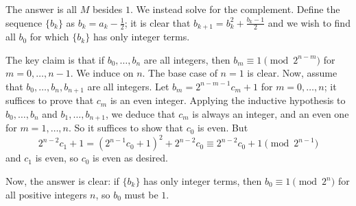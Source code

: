 The answer is all $M$ besides $1$. We instead solve for the complement. Define the sequence $\{b_k\}$ as $b_k=a_k-\frac{1}{2}$; it is clear that $b_{k+1}=b_k^2+\frac{b_k-1}{2}$ and we wish to find all $b_0$ for which $\{b_k\}$ has only integer terms.

The key claim is that if $b_0,\dots,b_n$ are all integers, then $b_m\equiv1\pmod{2^{n-m}}$ for $m=0,\dots,n-1$. We induce on $n$. The base case of $n=1$ is clear. Now, assume that $b_0,\dots,b_n,b_{n+1}$ are all integers. Let $b_m=2^{n-m-1}c_m+1$ for $m=0,\dots,n$; it suffices to prove that $c_m$ is an even integer. Applying the inductive hypothesis to $b_0,\dots,b_n$ and $b_1,\dots,b_{n+1}$, we deduce that $c_m$ is always an integer, and an even one for $m=1,\dots,n$. So it suffices to show that $c_0$ is even. But
\[
	2^{n-2}c_1+1=(2^{n-1}c_0+1)^2+2^{n-2}c_0\equiv2^{n-2}c_0+1\pmod{2^{n-1}}
\]
and $c_1$ is even, so $c_0$ is even as desired.

Now, the answer is clear: if $\{b_k\}$ has only integer terms, then $b_0\equiv1\pmod{2^n}$ for all positive integers $n$, so $b_0$ must be $1$.

